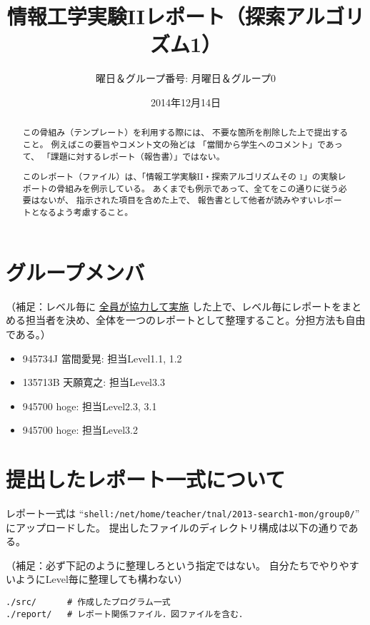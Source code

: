 \documentclass[10pt]{jarticle}
\begin{document}
\title{情報工学実験IIレポート（探索アルゴリズム1）}
\author{曜日＆グループ番号: 月曜日＆グループ0} %
\date{2014年12月14日}

\maketitle

\begin{abstract}
この骨組み（テンプレート）を利用する際には、
不要な箇所を削除した上で提出すること。
例えばこの要旨やコメント文の殆どは
「當間から学生へのコメント」であって、
「課題に対するレポート（報告書）」ではない。

このレポート（ファイル）は、「情報工学実験II・探索アルゴリズムその
1\cite{info2-search1}」の実験レポートの骨組みを例示している。
あくまでも例示であって、全てをこの通りに従う必要はないが、
指示された項目を含めた上で、
報告書として他者が読みやすいレポートとなるよう考慮すること。
\end{abstract}

\section*{グループメンバ}
（補足：レベル毎に \underline{全員が協力して実施} した上で、レベル毎にレポートをまとめる担当者を決め、全体を一つのレポートとして整理すること。分担方法も自由である。）
\begin{itemize}
 \item 945734J 當間愛晃: 担当Level1.1, 1.2
 \item 135713B 天願寛之: 担当Level3.3
 \item 945700 hoge: 担当Level2.3, 3.1
 \item 945700 hoge: 担当Level3.2
\end{itemize}

\section*{提出したレポート一式について}
レポート一式は
``\verb|shell:/net/home/teacher/tnal/2013-search1-mon/group0/|''
にアップロードした。
提出したファイルのディレクトリ構成は以下の通りである。

\vspace{+0.5cm}
（補足：必ず下記のように整理しろという指定ではない。
自分たちでやりやすいようにLevel毎に整理しても構わない）
\begin{breakbox}
\begin{verbatim}
./src/      # 作成したプログラム一式
./report/   # レポート関係ファイル．図ファイルを含む．
\end{verbatim}
\end{breakbox}
\end{document}
